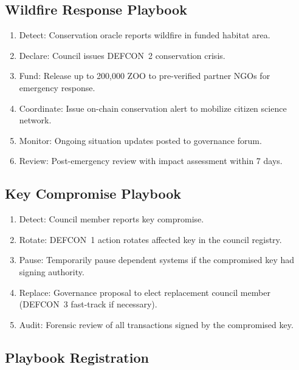 \documentclass[11pt,letterpaper]{article}
\begin{document}
\subsection{Wildfire Response Playbook}

\begin{enumerate}
    \item Detect: Conservation oracle reports wildfire in funded habitat area.
    \item Declare: Council issues DEFCON~2 conservation crisis.
    \item Fund: Release up to 200{,}000 ZOO to pre-verified partner NGOs for emergency response.
    \item Coordinate: Issue on-chain conservation alert to mobilize citizen science network.
    \item Monitor: Ongoing situation updates posted to governance forum.
    \item Review: Post-emergency review with impact assessment within 7 days.
\end{enumerate}

\subsection{Key Compromise Playbook}

\begin{enumerate}
    \item Detect: Council member reports key compromise.
    \item Rotate: DEFCON~1 action rotates affected key in the council registry.
    \item Pause: Temporarily pause dependent systems if the compromised key had signing authority.
    \item Replace: Governance proposal to elect replacement council member (DEFCON~3 fast-track if necessary).
    \item Audit: Forensic review of all transactions signed by the compromised key.
\end{enumerate}

\subsection{Playbook Registration}
\end{document}

